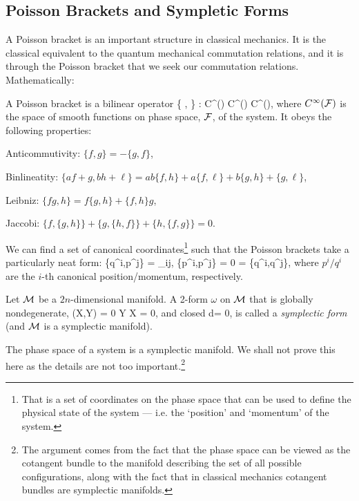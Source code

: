 \subsection{Poisson Brackets and Sympletic Forms}

A Poisson bracket is an important structure in classical mechanics. It is the classical equivalent to the quantum mechanical commutation relations, and it is through the Poisson bracket that we seek our commutation relations. Mathematically: 

    A Poisson bracket is a bilinear operator 
    \bse 
        \{ \cdot, \cdot \} : C^{\infty}(\cF) \times  C^{\infty}(\cF) \to  C^{\infty}(\cF),
    \ese 
    where $C^{\infty}(\mathcal{F})$ is the space of smooth functions on phase space, $\mathcal{F}$, of the system. It obeys the following properties: 
    \ben 
    \item Anticommutivity: $\{f,g\} = -\{g,f\}$, 
    \item Binlineatity: $\{af+g,bh+\ell\} = ab\{f,h\} + a\{f,\ell\} + b\{g,h\} + \{g,\ell\}$,
    \item Leibniz: $\{fg,h\} = f\{g,h\} + \{f,h\}g$,
    \item Jaccobi: $\{f,\{g,h\}\} + \{g,\{h,f\}\} + \{h,\{f,g\}\} =0$.
    \een 
\ed 

We can find a set of canonical coordinates\footnote{That is a set of coordinates on the phase space that can be used to define the physical state of the system --- i.e. the `position' and `momentum' of the system.} such that the Poisson brackets take a particularly neat form:
\be 
\label{eqn:PoissonCanonical}
    \{q^i,p^j\} = \del_{ij}, \qquad \{p^i,p^j\} = 0 = \{q^i,q^j\},
\ee 
where $p^i/q^i$ are the $i$-th canonical position/momentum, respectively. 

    Let $\mathcal{M}$ be a $2n$-dimensional manifold. A 2-form $\omega$ on $\mathcal{M}$ that is globally nondegenerate,
    \bse 
        \omega(X,Y) = 0 \quad \forall Y \implies X = 0,
    \ese 
    and closed
    \bse 
        d\omega = 0,
    \ese 
    is called a \textit{symplectic form} (and $\mathcal{M}$ is a symplectic manifold). 
\ed 

\bcl
    The phase space of a system is a symplectic manifold. 
\ecl
We shall not prove this here as the details are not too important.\footnote{The argument comes from the fact that the phase space can be viewed as the cotangent bundle to the manifold describing the set of all possible configurations, along with the fact that in classical mechanics cotangent bundles are symplectic manifolds.}

